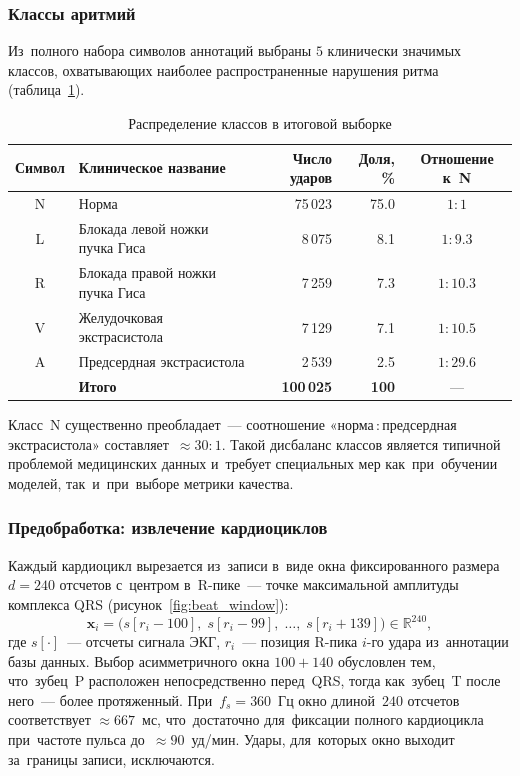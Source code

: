 \subsubsection{Классы аритмий}

Из~полного набора символов аннотаций выбраны $5$ клинически значимых
классов, охватывающих наиболее распространенные нарушения ритма
(таблица~\ref{tab:class_dist}).

\begin{table}[h]
\centering
\caption{Распределение классов в итоговой выборке}
\label{tab:class_dist}
\begin{tabular}{clrrc}
\hline
\textbf{Символ} & \textbf{Клиническое название} & \textbf{Число ударов} &
\textbf{Доля, \%} & \textbf{Отношение к~N} \\
\hline
N & Норма                               & 75\,023 & 75.0 & $1\!:\!1$    \\
L & Блокада левой ножки пучка Гиса      &  8\,075 &  8.1 & $1\!:\!9.3$  \\
R & Блокада правой ножки пучка Гиса     &  7\,259 &  7.3 & $1\!:\!10.3$ \\
V & Желудочковая экстрасистола           &  7\,129 &  7.1 & $1\!:\!10.5$ \\
A & Предсердная экстрасистола            &  2\,539 &  2.5 & $1\!:\!29.6$ \\
\hline
  & \textbf{Итого}                      & \textbf{100\,025} &
  \textbf{100} & --- \\
\hline
\end{tabular}
\end{table}

Класс~N существенно преобладает~--- соотношение «норма\,:\,предсердная
экстрасистола» составляет~$\approx 30\!:\!1$.
Такой дисбаланс классов является типичной проблемой медицинских
данных и~требует специальных мер как~при~обучении моделей,
так~и~при~выборе метрики качества.

\subsubsection{Предобработка: извлечение кардиоциклов}

Каждый кардиоцикл вырезается из~записи в~виде окна фиксированного
размера $d = 240$ отсчетов с~центром в~R-пике~--- точке максимальной
амплитуды комплекса QRS (рисунок~\ref{fig:beat_window}):
\begin{equation}
    \label{eq:window}
    \mathbf{x}_i = \bigl(s[r_i - 100],\; s[r_i - 99],\; \ldots,\;
    s[r_i + 139]\bigr) \in \mathbb{R}^{240},
\end{equation}
где $s[\cdot]$~--- отсчеты сигнала ЭКГ, $r_i$~--- позиция R-пика
$i$-го удара из~аннотации базы данных.
Выбор асимметричного окна $100 + 140$ обусловлен тем, что~зубец~P
расположен непосредственно перед~QRS, тогда как~зубец~T после
него~--- более протяженный.
При~$f_s = 360$~Гц окно длиной~$240$ отсчетов соответствует
$\approx 667$~мс, что~достаточно для~фиксации полного кардиоцикла
при~частоте пульса до~$\approx 90$~уд/мин.
Удары, для~которых окно выходит за~границы записи, исключаются.


